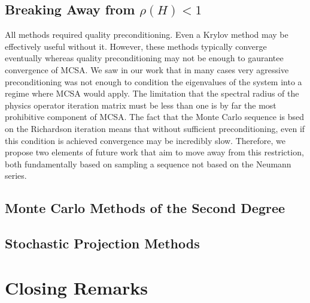 \subsection{Breaking Away from $\rho(H) < 1$}
\label{subsec:future_spec_rad}

All methods required quality preconditioning. Even a Krylov method may
be effectively useful without it. However, these methods typically
converge eventually whereas quality preconditioning may not be enough
to gaurantee convergence of MCSA. We saw in our work that in many
cases very agressive preconditioning was not enough to condition the
eigenvalues of the system into a regime where MCSA would apply. The
limitation that the spectral radius of the physics operator iteration
matrix must be less than one is by far the most prohibitive component
of MCSA. The fact that the Monte Carlo sequence is bsed on the
Richardson iteration means that without sufficient preconditioning,
even if this condition is achieved convergence may be incredibly
slow. Therefore, we propose two elements of future work that aim to
move away from this restriction, both fundamentally based on sampling
a sequence not based on the Neumann series.

\subsection{Monte Carlo Methods of the Second Degree}
\label{subsubsec:2_degree_mc}


\subsection{Stochastic Projection Methods}
\label{subsubsec:stochastic_projection_methods}

\section{Closing Remarks\ }
\label{sec:closing}
